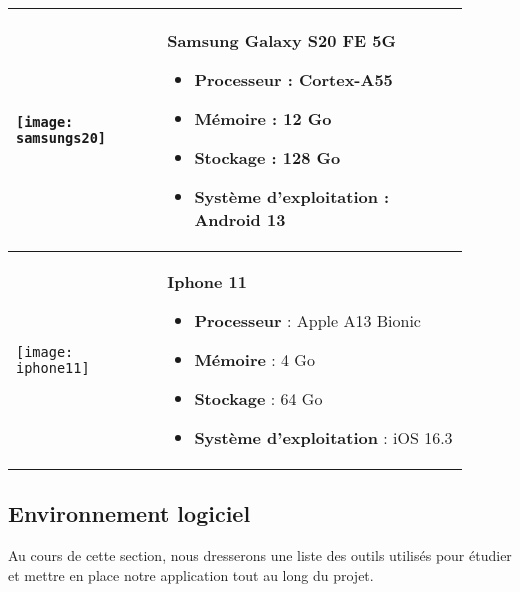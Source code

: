 \begin{longtable}{|p{0.3\linewidth}|p{0.6\linewidth}|}
      \hline
      \begin{minipage}{\linewidth}
       \texttt{[image: samsungs20]}
      \end{minipage} &
      \begin{minipage}{\linewidth}
        \vspace{0.2cm}
        \textbf{Samsung Galaxy S20 FE 5G}
        \begin{itemize}
          \item \textbf{Processeur} : Cortex-A55 
          \item \textbf{Mémoire} : 12 Go 
          \item \textbf{Stockage} : 128 Go
          \item \textbf{Système d'exploitation} : Android 13
        \end{itemize}
        \vspace{0.2cm}
      \end{minipage} \\

      \hline
      \begin{minipage}{\linewidth}
       \texttt{[image: iphone11]}
      \end{minipage} &
      \begin{minipage}{\linewidth}
        \vspace{0.2cm}
        \textbf{Iphone 11}
        \begin{itemize}
          \item \textbf{Processeur} : Apple A13 Bionic
          \item \textbf{Mémoire} : 4 Go
          \item \textbf{Stockage} : 64 Go
          \item \textbf{Système d'exploitation} : iOS 16.3
        \end{itemize}
        \vspace{0.2cm}
      \end{minipage} \\

      \hline
      
      


\end{longtable}

\subsection{Environnement logiciel}
Au cours de cette section, nous dresserons une liste des outils utilisés pour étudier et mettre en place notre application tout au long du projet.


